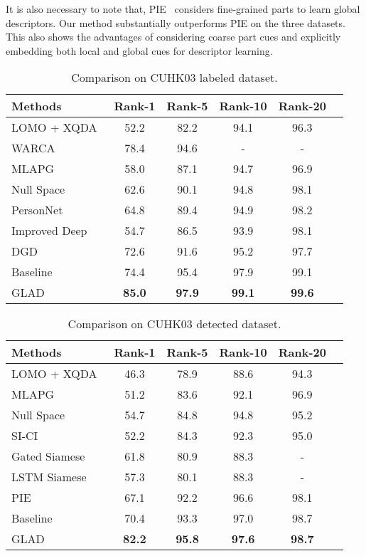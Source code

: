 \documentclass[sigconf]{acmart}
\begin{document}
It is also necessary to note that, PIE~\cite{zheng2017pose} considers fine-grained parts to learn global descriptors. Our method substantially outperforms PIE on the three datasets. This also shows the advantages of considering coarse part cues and explicitly embedding both local and global cues for descriptor learning.




\begin{table}
\centering
\small
\caption{Comparison on CUHK03 labeled dataset.}
\begin{tabular}{lccccc}
\hline
 Methods            &Rank-1   &Rank-5   &Rank-10   &Rank-20 \\
\hline
LOMO + XQDA~\cite{LOMOXQAD} &52.2    &82.2    &94.1    &96.3\\
WARCA~\cite{WARCA} &78.4    &94.6    &-   &-\\
MLAPG~\cite{MLAPG} &58.0 &87.1 &94.7 &96.9 \\
Null Space~\cite{LDNS}     &62.6    &90.1    &94.8    &98.1\\
\hline
PersonNet~\cite{wu2016personnet}            &64.8    &89.4    &94.9    &98.2 \\
Improved Deep~\cite{ahmed2015improved}                 &54.7    &86.5    &93.9    &98.1\\
DGD~\cite{xiao2016learning}                &72.6    &91.6    &95.2    &97.7\\
\hline
Baseline & 74.4  & 95.4 & 97.9  & 99.1 \\
GLAD      &{\bf85.0}&{\bf97.9}&{\bf99.1}&{\bf99.6}\\
\hline

\end{tabular}
\label{tab:cuhk03lab}
\end{table}



\begin{table}
\centering
\small
\caption{Comparison on CUHK03 detected dataset.}
\begin{tabular}{lccccc}
\hline
 Methods            &Rank-1    &Rank-5    &Rank-10  &Rank-20 \\
\hline
LOMO + XQDA~\cite{LOMOXQAD} &46.3    &78.9    &88.6    &94.3\\
MLAPG~\cite{MLAPG} &51.2 &83.6 &92.1 &96.9 \\
Null Space~\cite{LDNS}    &54.7    &84.8    &94.8    &95.2\\
\hline
SI-CI~\cite{SICI}                 &52.2    &84.3    &92.3    &95.0\\
Gated Siamese~\cite{GatedSiamese}                &61.8    &80.9    &88.3 &-\\
LSTM Siamese~\cite{varior2016siamese}                &57.3    &80.1    &88.3    &-\\
PIE~\cite{zheng2017pose}                &67.1    &92.2    &96.6    &98.1\\
\hline
Baseline & 70.4  & 93.3 & 97.0  & 98.7 \\
GLAD      &{\bf82.2}&{\bf95.8}&{\bf97.6}&{\bf98.7}\\
\hline
\end{tabular}
\label{tab:cuhk03dec}
\end{table}
\end{document}
